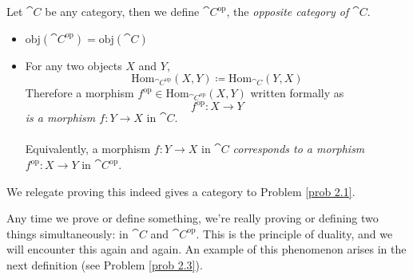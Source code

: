 
\begin{definition}
Let $\cat{C}$ be any category, then we define $\cat{C}^{\text{op}}$, the \emph{opposite category of $\cat{C}$}.
\begin{itemize}
\item $\mathrm{obj}(\cat{C}^{\text{op}}) = \mathrm{obj}(\cat{C})$
\item For any two objects $X$ and $Y$,
\[\mathrm{Hom}_{\cat{C}^{\text{op}}}(X,Y) \coloneqq \mathrm{Hom}_{\cat{C}}(Y,X)\]
Therefore a morphism $f^{\text{op}} \in \mathrm{Hom}_{\cat{C}^{\text{op}}}(X,Y)$ written formally as
\[f^{\text{op}}: X \to Y\]
\emph{is a morphism $f: Y \to X$} in $\cat{C}$.\\
\\
Equivalently, a morphism $f:Y \to X$ in $\cat{C}$ \emph{corresponds to a morphism $f^{\text{op}}: X \to Y$} in $\cat{C}^{\text{op}}$.
\end{itemize}
We relegate proving this indeed gives a category to Problem \ref{prob 2.1}.
\end{definition}


\begin{remark}
Any time we prove or define something, we're really proving or defining two things simultaneously: in $\cat{C}$ and $\cat{C}^{\text{op}}$. This is the principle of duality, and we will encounter this again and again. An example of this phenomenon arises in the next definition (see Problem \ref{prob 2.3}).
\end{remark}

\vspace*{0.1in}

